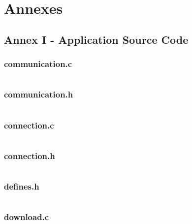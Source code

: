 \documentclass[11pt]{article}
\begin{document}
\newpage

\section*{Annexes}

\subsection*{Annex I - Application Source Code}

\subsubsection*{communication.c}

\inputminted{c}{communication.c}

\newpage

\subsubsection*{communication.h}

\inputminted{c}{communication.h}

\newpage

\subsubsection*{connection.c}

\inputminted{c}{connection.c}

\newpage

\subsubsection*{connection.h}

\inputminted{c}{connection.h}

\newpage

\subsubsection*{defines.h}

\inputminted{c}{defines.h}

\newpage

\subsubsection*{download.c}

\inputminted{c}{download.c}

\newpage
\end{document}
